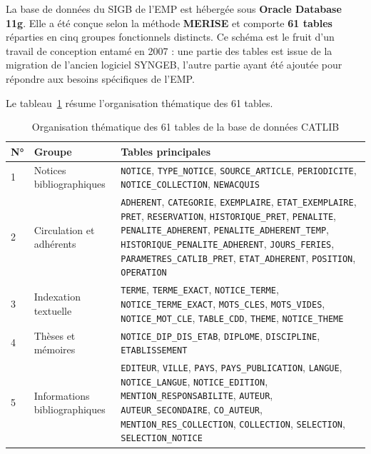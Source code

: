 La base de données du SIGB de l'EMP est hébergée sous \textbf{Oracle Database
11g}. Elle a été conçue selon la méthode \textbf{MERISE} et comporte
\textbf{61 tables} réparties en cinq groupes fonctionnels distincts. Ce schéma
est le fruit d'un travail de conception entamé en 2007 : une partie des tables
est issue de la migration de l'ancien logiciel SYNGEB, l'autre partie ayant été
ajoutée pour répondre aux besoins spécifiques de l'EMP.

Le tableau~\ref{tab:groupes_tables} résume l'organisation thématique des
61 tables.
\newpage
\begin{table}[H]
\centering
\caption{Organisation thématique des 61 tables de la base de données CATLIB}
\label{tab:groupes_tables}
\renewcommand{\arraystretch}{1.4}
\begin{tabular}{|p{0.5cm}|p{4.5cm}|p{8cm}|}
\hline

\textbf{N°} & \textbf{Groupe} & \textbf{Tables principales} \\
\hline
1 & Notices bibliographiques &
\texttt{NOTICE}, \texttt{TYPE\_NOTICE}, \texttt{SOURCE\_ARTICLE},
\texttt{PERIODICITE}, \texttt{NOTICE\_COLLECTION}, \texttt{NEWACQUIS} \\
\hline
2 & Circulation et adhérents &
\texttt{ADHERENT}, \texttt{CATEGORIE}, \texttt{EXEMPLAIRE},
\texttt{ETAT\_EXEMPLAIRE}, \texttt{PRET}, \texttt{RESERVATION},
\texttt{HISTORIQUE\_PRET}, \texttt{PENALITE}, \texttt{PENALITE\_ADHERENT},
\texttt{PENALITE\_ADHERENT\_TEMP},
\texttt{HISTORIQUE\_PENALITE\_ADHERENT},
\texttt{JOURS\_FERIES},
\texttt{PARAMETRES\_CATLIB\_PRET},
\texttt{ETAT\_ADHERENT},
\texttt{POSITION}, \texttt{OPERATION} \\
\hline
3 & Indexation textuelle &
\texttt{TERME}, \texttt{TERME\_EXACT}, \texttt{NOTICE\_TERME},
\texttt{NOTICE\_TERME\_EXACT}, \texttt{MOTS\_CLES}, \texttt{MOTS\_VIDES},
\texttt{NOTICE\_MOT\_CLE}, \texttt{TABLE\_CDD}, \texttt{THEME},
\texttt{NOTICE\_THEME} \\
\hline
4 & Thèses et mémoires &
\texttt{NOTICE\_DIP\_DIS\_ETAB}, \texttt{DIPLOME},
\texttt{DISCIPLINE}, \texttt{ETABLISSEMENT} \\
\hline
5 & Informations bibliographiques &
\texttt{EDITEUR}, \texttt{VILLE}, \texttt{PAYS}, \texttt{PAYS\_PUBLICATION},
\texttt{LANGUE}, \texttt{NOTICE\_LANGUE}, \texttt{NOTICE\_EDITION},
\texttt{MENTION\_RESPONSABILITE}, \texttt{AUTEUR},
\texttt{AUTEUR\_SECONDAIRE}, \texttt{CO\_AUTEUR},
\texttt{MENTION\_RES\_COLLECTION}, \texttt{COLLECTION},
\texttt{SELECTION}, \texttt{SELECTION\_NOTICE} \\
\hline
\end{tabular}
\end{table}

